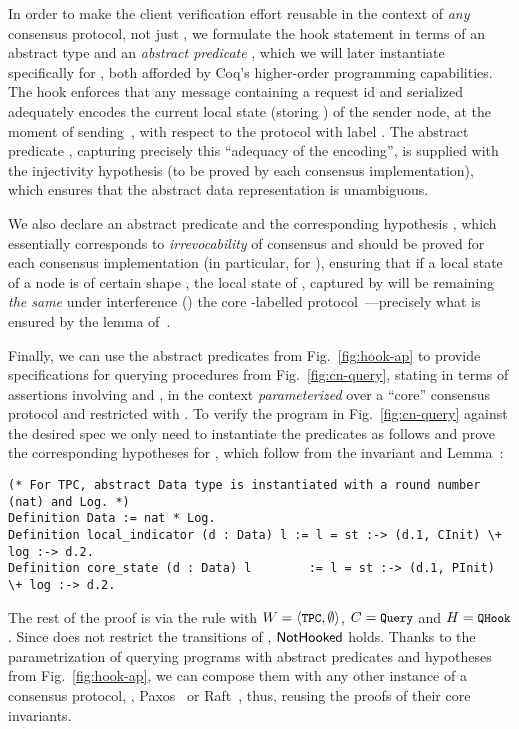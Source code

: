 In order to make the client verification effort reusable in the
context of \emph{any} consensus protocol, not just , we
formulate the hook statement in terms of an abstract type 
and an \emph{abstract predicate} , which we will
later instantiate specifically for , both afforded by Coq's
higher-order programming capabilities. The hook enforces that any
message  containing a request id  and serialized
 adequately encodes the current local state (storing
) of the sender node, at the moment of sending~,
with respect to the protocol with label .
%
The abstract predicate , capturing precisely
this ``adequacy of the encoding'', is supplied with the injectivity
hypothesis  (to be proved by each consensus
implementation), which ensures that the abstract data representation
is unambiguous.

We also declare an abstract predicate  and the
corresponding hypothesis , which essentially
corresponds to \emph{irrevocability} of consensus and should be proved
for each consensus implementation (in particular, for ),
ensuring that if a local state of a node  is of certain shape
, the local state of , captured by
 will be remaining \emph{the same} under
interference () \wrt the core -labelled
protocol~---precisely what is ensured by the lemma
 of~.

Finally, we can use the abstract predicates from
Fig.~\ref{fig:hook-ap} to provide specifications for querying
procedures from Fig.~\ref{fig:cn-query}, stating  in
terms of assertions involving  and
, in the context \emph{parameterized} over a
``core'' consensus protocol  and restricted with
.
%
To verify the program in Fig.~\ref{fig:cn-query} against the desired
spec we only need to instantiate the predicates as follows and prove
the corresponding hypotheses for , which follow from the
invariant  and Lemma~:

\begin{lstlisting}[basicstyle=\footnotesize\ttfamily]
(* For TPC, abstract Data type is instantiated with a round number (nat) and Log. *)
Definition Data := nat * Log.
Definition local_indicator (d : Data) l := l = st :-> (d.1, CInit) \+ log :-> d.2.
Definition core_state (d : Data) l        := l = st :-> (d.1, PInit) \+ log :-> d.2.
\end{lstlisting}
%
The rest of the proof is via the  rule with
$W = \angled{\text{\code{TPC}}, \emptyset}$, $C = \text{\code{Query}}$ and
$H = \text{\code{QHook}}$. Since  does not restrict the
transitions of , $\mathsf{NotHooked}$ holds.
%
Thanks to the parametrization of querying programs with abstract
predicates and hypotheses from Fig.~\ref{fig:hook-ap}, we can compose
them with any other instance of a consensus protocol, \eg,
Paxos~\cite{Lamport:TOPLAS98} or Raft~\cite{Ongaro-Ousterhout:UATC14},
thus, reusing the proofs of their core invariants.

